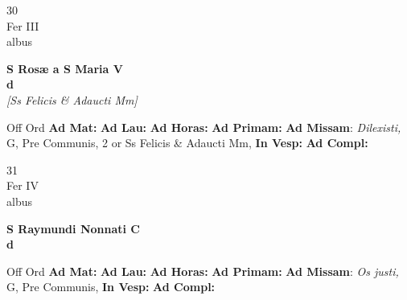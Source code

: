 \documentclass[10pt, openany]{book}
\begin{document}
    \begin{center}
        \begin{minipage}{3.5in}
            \vspace{2em}
            \begin{minipage}{0.5in}
                {\Huge 30} \\
                {\normalsize Fer III} \\
                {\normalsize albus}
            \end{minipage}
            \begin{minipage}{3.0in}
                \textbf{ \large S Rosæ a S Maria V \\
                \textnormal{\normalsize d}} \\ \textit{[Ss Felicis \& Adaucti Mm]} \\ 
            \end{minipage}
            \begin{justify}Off Ord
                \textbf{Ad Mat: }
                \textbf{Ad Lau: }
                \textbf{Ad Horas: }
                \textbf{Ad Primam: }\textbf{Ad Missam}: \textit{Dilexisti,} G, Pre Communis, 2 or Ss Felicis \& Adaucti Mm,  
                \textbf{In Vesp: }
                \textbf{Ad Compl: }
            \end{justify}
        \end{minipage}
    \end{center}

    \begin{center}
        \begin{minipage}{3.5in}
            \vspace{2em}
            \begin{minipage}{0.5in}
                {\Huge 31} \\
                {\normalsize Fer IV} \\
                {\normalsize albus}
            \end{minipage}
            \begin{minipage}{3.0in}
                \textbf{ \large S Raymundi Nonnati C \\
                \textnormal{\normalsize d}} \\ 
            \end{minipage}
            \begin{justify}Off Ord
                \textbf{Ad Mat: }
                \textbf{Ad Lau: }
                \textbf{Ad Horas: }
                \textbf{Ad Primam: }\textbf{Ad Missam}: \textit{Os justi,} G, Pre Communis,  
                \textbf{In Vesp: }
                \textbf{Ad Compl: }
            \end{justify}
        \end{minipage}
    \end{center}
\end{document}
